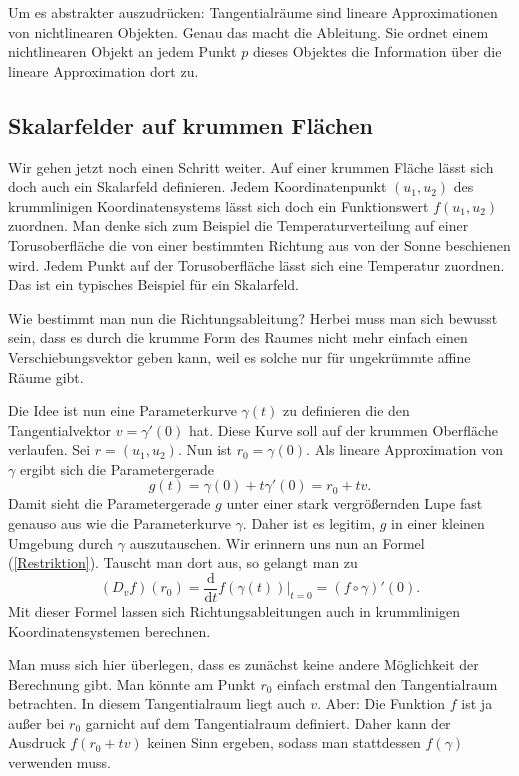 \documentclass[a4paper,12pt,fleqn]{article}
\begin{document}
Um es abstrakter auszudrücken: Tangentialräume sind lineare
Approximationen von nichtlinearen Objekten. Genau das macht
die Ableitung. Sie ordnet einem nichtlinearen Objekt an jedem
Punkt \(p\) dieses Objektes die Information über die lineare
Approximation dort zu.

\subsection{Skalarfelder auf krummen Flächen}

Wir gehen jetzt noch einen Schritt weiter.
Auf einer krummen Fläche lässt sich doch auch ein
Skalarfeld definieren. Jedem Koordinatenpunkt \((u_1,u_2)\)
des krummlinigen Koordinatensystems lässt sich doch
ein Funktionswert \(f(u_1,u_2)\) zuordnen. Man denke sich zum Beispiel
die Temperaturverteilung auf einer Torusoberfläche die von einer
bestimmten Richtung aus von der Sonne beschienen wird. Jedem Punkt
auf der Torusoberfläche lässt sich eine Temperatur zuordnen.
Das ist ein typisches Beispiel für ein Skalarfeld.

Wie bestimmt man nun die Richtungsableitung? Herbei muss man sich
bewusst sein, dass es durch die krumme Form des Raumes nicht mehr
einfach einen Verschiebungsvektor geben kann, weil es solche nur für
ungekrümmte affine Räume gibt.

Die Idee ist nun eine Parameterkurve \(\gamma(t)\) zu definieren die den
Tangentialvektor \(v=\gamma'(0)\) hat. Diese Kurve soll auf der
krummen Oberfläche verlaufen. Sei \(r=(u_1,u_2)\). Nun ist
\(r_0=\gamma(0)\). Als lineare Approximation von \(\gamma\) ergibt
sich die Parametergerade
\begin{equation}
g(t) = \gamma(0)+t\gamma'(0) = r_0+tv.
\end{equation}
Damit sieht die Parametergerade \(g\) unter einer stark vergrößernden
Lupe fast genauso aus wie die Parameterkurve \(\gamma\). Daher
ist es legitim, \(g\) in einer kleinen Umgebung durch \(\gamma\)
auszutauschen. Wir erinnern uns nun an Formel (\ref{Restriktion}).
Tauscht man dort aus, so gelangt man zu
\begin{equation}\label{viagamma}
(D_v f)(r_0) = \frac{\mathrm d}{\mathrm dt}f(\gamma(t))\Big|_{t=0}
= (f\circ\gamma)'(0).
\end{equation}
Mit dieser Formel lassen sich Richtungsableitungen auch
in krummlinigen Koordinatensystemen berechnen.

Man muss sich hier überlegen, dass es zunächst keine andere Möglichkeit
der Berechnung gibt. Man könnte am Punkt \(r_0\) einfach erstmal
den Tangentialraum betrachten. In diesem Tangentialraum liegt auch
\(v\). Aber: Die Funktion \(f\) ist ja außer bei \(r_0\)
garnicht auf dem Tangentialraum definiert. Daher kann der Ausdruck
\(f(r_0+tv)\) keinen Sinn ergeben, sodass man stattdessen
\(f(\gamma)\) verwenden muss.
\end{document}
